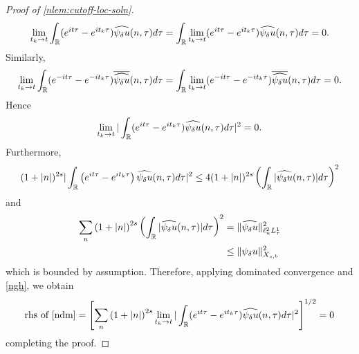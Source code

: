 \begin{proof}[Proof of \cref{nlem:cutoff-loc-soln}]
%
\begin{equation*}
\begin{split}
\lim_{t_{k} \to t}  \int_{\mathbb{R}} (e^{it \tau} - e^{it_{k} \tau})
    \widehat{\psi_{\delta} u}(n,
    \tau) d \tau =  \int_{\mathbb{R}} \lim_{t_{k} \to t} (e^{it \tau} - e^{it_{k} \tau})
    \widehat{\psi_{\delta} u}(n,
    \tau) d \tau = 0. 
\end{split}
\end{equation*}
%
%
Similarly, 
%
%
%
\begin{equation*}
\begin{split}
\lim_{t_{k} \to t} \int_{\mathbb{R}} (e^{-it \tau} - e^{-it_{k} \tau})
    \overline{\widehat{\psi_{\delta} u}}(n,
    \tau) d \tau  =\int_{\mathbb{R}}  \lim_{t_{k} \to t} (e^{-it \tau} - e^{-it_{k} \tau})
    \overline{\widehat{\psi_{\delta} u}}(n,
    \tau) d \tau  = 0.
\end{split}
\end{equation*}
%
%
Hence
%
%
%
\begin{equation}
  \label{ngh}
\begin{split}
  \lim_{t_{k} \to t} | \int_{\mathbb{R}} (e^{it \tau} - e^{it_{k} \tau})
    \widehat{\psi_{\delta} u}(n,
		\tau) d \tau |^2 = 0.
\end{split}
\end{equation}
%
%
		Furthermore,
    \begin{equation*}
    \begin{split}
      (1 + | n |)^{2s} | \int_{\mathbb{R}} \left( e^{it\tau} - e^{it_{k} \tau} \right)
      \widehat{\psi_{\delta}u}(n, \tau) d \tau|^{2} \le 4 (1 + | n |)^{2s} \left(
      \int_{\mathbb{R}} | \widehat{\psi_{\delta} u}(n, \tau)  | d \tau
      \right)^{2}
    \end{split}
    \end{equation*}
    and
		\begin{equation*}
			\begin{split}
         \sum_{n}  \left( 1 + | n |
        \right)^{2s} \left ( \int_{\mathbb{R}} |\widehat{\psi_{\delta} u}(n, \tau)| d \tau
        \right )^2  
        & = \|\widehat{\psi_{\delta} u}\|_{\ell^{2}_{n}L^{1}_{\tau}}^2
		\\
		& \le \|\psi_{\delta} u \|_{X_{s,b}}^2 
	\end{split}
\end{equation*}
which is bounded by assumption. Therefore, applying dominated convergence and
\eqref{ngh}, we
obtain 
%
%
\begin{equation*}
\begin{split}
  \text{rhs of \eqref{ndm}} = \left[ \sum_{n} \left( 1 + | n |
    \right)^{2s} \lim_{t_{k} \to t} | \int_{\mathbb{R}} (e^{it \tau} - e^{it_{k} \tau})
    \widehat{\psi_{\delta} u}(n,
		\tau) d \tau |^2 \right]^{1/2} = 0
\end{split}
\end{equation*}
%
%
completing the proof. 
\end{proof}
